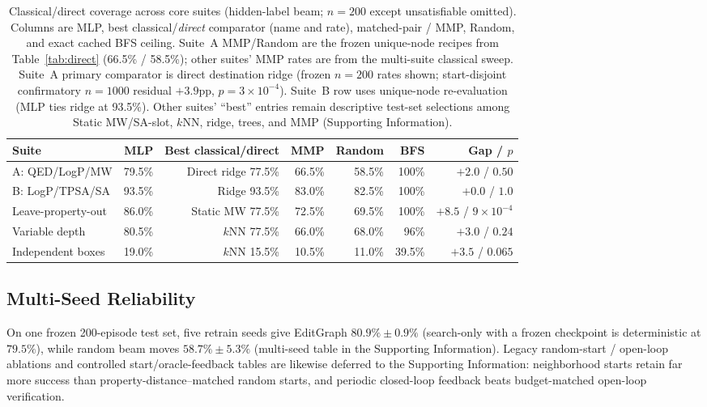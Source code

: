 \begin{table}[t]
\caption{Classical/direct coverage across core suites (hidden-label beam; $n{=}200$ except unsatisfiable omitted). Columns are MLP, best classical/\emph{direct} comparator (name and rate), matched-pair / MMP, Random, and exact cached BFS ceiling. Suite~A MMP/Random are the frozen unique-node recipes from Table~\ref{tab:direct} (66.5\% / 58.5\%); other suites' MMP rates are from the multi-suite classical sweep. Suite~A primary comparator is direct destination ridge (frozen $n{=}200$ rates shown; start-disjoint confirmatory $n{=}1000$ residual $+3.9$pp, $p{=}3\times10^{-4}$). Suite~B row uses unique-node re-evaluation (MLP ties ridge at 93.5\%). Other suites' ``best'' entries remain descriptive test-set selections among Static MW/SA-slot, $k$NN, ridge, trees, and MMP (Supporting Information).}
\label{tab:classical_matrix}
\centering
\small
\begin{tabular}{lrrrrrr}
\toprule
Suite & MLP & Best classical/direct & MMP & Random & BFS & Gap / $p$ \\
\midrule
A: QED/LogP/MW & 79.5\% & Direct ridge 77.5\% & 66.5\% & 58.5\% & 100\% & $+2.0$ / $0.50$ \\
B: LogP/TPSA/SA & 93.5\% & Ridge 93.5\% & 83.0\% & 82.5\% & 100\% & $+0.0$ / $1.0$ \\
Leave-property-out & 86.0\% & Static MW 77.5\% & 72.5\% & 69.5\% & 100\% & $+8.5$ / $9\times10^{-4}$ \\
Variable depth & 80.5\% & $k$NN 77.5\% & 66.0\% & 68.0\% & 96\% & $+3.0$ / $0.24$ \\
Independent boxes & 19.0\% & $k$NN 15.5\% & 10.5\% & 11.0\% & 39.5\% & $+3.5$ / $0.065$ \\
\bottomrule
\end{tabular}
\end{table}
\FloatBarrier

\subsection{Multi-Seed Reliability}
\label{sec:multiseed}

On one frozen 200-episode test set, five retrain seeds give EditGraph $80.9\%\pm0.9\%$ (search-only with a frozen checkpoint is deterministic at $79.5\%$), while random beam moves $58.7\%\pm5.3\%$ (multi-seed table in the Supporting Information). Legacy random-start / open-loop ablations and controlled start/oracle-feedback tables are likewise deferred to the Supporting Information: neighborhood starts retain far more success than property-distance--matched random starts, and periodic closed-loop feedback beats budget-matched open-loop \mbox{verification}.

